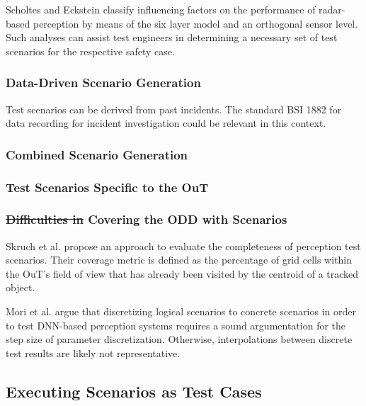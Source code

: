 \documentclass[conference]{IEEEtran}
\newcommand{\citeold}[1]{{\hypersetup{citecolor=black}\cite{#1}}}
\newcommand{\new}[1]{{\color{my-red}#1}}
\begin{document}
Scholtes and Eckstein \cite{Scholtes2021systematic} classify  influencing factors on the performance of radar-based perception by means of the six layer model \citeold{Scholtes20216lmAccess} and an orthogonal sensor level. 
Such analyses can assist test engineers in determining a necessary set of test scenarios for the respective safety case. 


\subsubsection{Data-Driven Scenario Generation}
\label{sec:scenario_gen_data_driven}

Test scenarios can be derived from past incidents. 
The standard BSI 1882 \cite{BSI2021_pas1882} for data recording for incident investigation could be relevant in this context.

\subsubsection{Combined Scenario Generation}
\subsubsection{Test Scenarios Specific to the \new{OuT}}
\subsubsection{\sout{Difficulties in }Covering the ODD with Scenarios}

Skruch et al. \cite{Skruch2021completeness} propose an approach to evaluate the completeness of perception test scenarios.
Their coverage metric is defined as the percentage of grid cells within the OuT's field of view that has already been visited by the centroid of a tracked object. 

Mori et al. \cite{Mori2022discrete} argue that discretizing logical scenarios to concrete scenarios in order to test DNN-based perception systems requires a sound argumentation for the step size of parameter discretization. 
Otherwise, interpolations between discrete test results are likely not representative.

\subsection{Executing Scenarios as Test Cases}
\label{sec:executing_scenarios}
\end{document}

